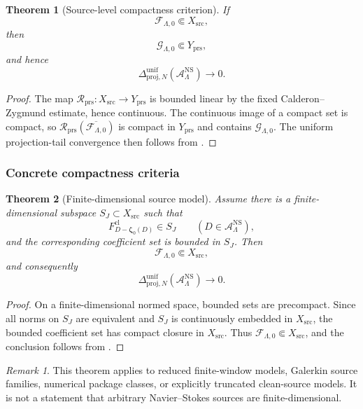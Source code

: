 \documentclass[11pt]{article}
\numberwithin{equation}{section}
\newtheorem{theorem}{Theorem}[section]
\theoremstyle{definition}
\theoremstyle{remark}
\newtheorem{remark}[remark]{Remark}
\newcommand{\NS}{\mathrm{NS}}
\newcommand{\src}{\mathrm{src}}
\newcommand{\cl}{\mathrm{cl}}
\newcommand{\bzeta}{\boldsymbol\zeta}
\begin{document}
\begin{theorem}[Source-level compactness criterion]
\label{thm:source-compact-pressure-compact}
If
\[
    \mathcal F_{\Lambda,0}\Subset X_{\src},
\]
then
\[
    \mathcal G_{\Lambda,0}\Subset Y_{\mathrm{prs}},
\]
and hence
\[
    \Delta_{\mathrm{proj},N}^{\mathrm{unif}}
    (\mathcal A_{\Lambda}^{\NS})
    \to0.
\]
\end{theorem}

\begin{proof}
The map \(\mathcal R_{\mathrm{prs}}:X_{\src}\to Y_{\mathrm{prs}}\) is bounded
linear by the fixed Calderon--Zygmund estimate, hence continuous.  The continuous
image of a compact set is compact, so
\(\mathcal R_{\mathrm{prs}}(\overline{\mathcal F_{\Lambda,0}})\) is compact in
\(Y_{\mathrm{prs}}\) and contains \(\mathcal G_{\Lambda,0}\).  The uniform
projection-tail convergence then follows from
.
\end{proof}

\subsubsection{Concrete compactness criteria}

\begin{theorem}[Finite-dimensional source model]
\label{thm:finite-dimensional-source-compactness}
Assume there is a finite-dimensional subspace \(S_J\subset X_{\src}\) such that
\[
    F^{\cl}_{D-\bzeta_0(D)}\in S_J
    \qquad
    (D\in\mathcal A_{\Lambda}^{\NS}),
\]
and the corresponding coefficient set is bounded in \(S_J\).  Then
\[
    \mathcal F_{\Lambda,0}\Subset X_{\src},
\]
and consequently
\[
    \Delta_{\mathrm{proj},N}^{\mathrm{unif}}
    (\mathcal A_{\Lambda}^{\NS})\to0.
\]
\end{theorem}

\begin{proof}
On a finite-dimensional normed space, bounded sets are precompact.  Since all
norms on \(S_J\) are equivalent and \(S_J\) is continuously embedded in
\(X_{\src}\), the bounded coefficient set has compact closure in \(X_{\src}\).
Thus \(\mathcal F_{\Lambda,0}\Subset X_{\src}\), and the conclusion follows from
.
\end{proof}

\begin{remark}
This theorem applies to reduced finite-window models, Galerkin source families,
numerical package classes, or explicitly truncated clean-source models.  It is
not a statement that arbitrary Navier--Stokes sources are finite-dimensional.
\end{remark}
\end{document}
